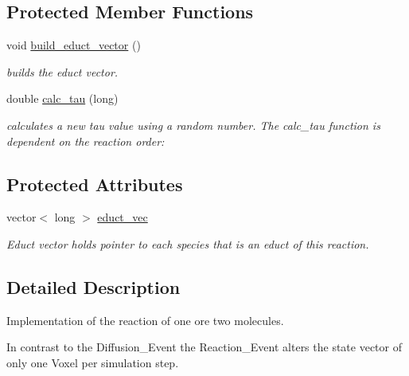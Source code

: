 \subsection*{Protected Member Functions}
\begin{DoxyCompactItemize}
\item 
void \hyperlink{classnw_1_1_reaction___evt_acc544c7890cdb51e794d26a845c8441f}{build\+\_\+educt\+\_\+vector} ()
\begin{DoxyCompactList}\small\item\em builds the educt vector. \end{DoxyCompactList}\item 
double \hyperlink{classnw_1_1_reaction___evt_ace67f5106799204a2f2cde8c6982589b}{calc\+\_\+tau} (long)
\begin{DoxyCompactList}\small\item\em calculates a new tau value using a random number. The calc\+\_\+tau function is dependent on the reaction order\+: \end{DoxyCompactList}\end{DoxyCompactItemize}
\subsection*{Protected Attributes}
\begin{DoxyCompactItemize}
\item 
vector$<$ long $>$ \hyperlink{classnw_1_1_reaction___evt_ae20c8b7d42ef1607200e1e2541db9a70}{educt\+\_\+vec}
\begin{DoxyCompactList}\small\item\em Educt vector holds pointer to each species that is an educt of this reaction. \end{DoxyCompactList}\end{DoxyCompactItemize}


\subsection{Detailed Description}
Implementation of the reaction of one ore two molecules. 

In contrast to the Diffusion\+\_\+\+Event the Reaction\+\_\+\+Event alters the state vector of only one Voxel per simulation step. 

